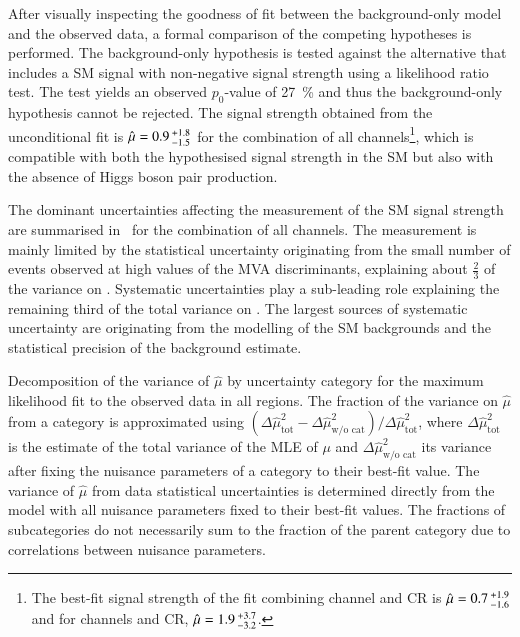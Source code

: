 
After visually inspecting the goodness of fit between the
background-only model and the observed data, a formal comparison of
the competing hypotheses is performed. The background-only hypothesis
is tested against the alternative that includes a SM \HH signal with
non-negative signal strength using a likelihood ratio test. The test
yields an observed $p_0$-value of \SI{27}{\percent} and thus the
background-only hypothesis cannot be rejected.
The signal strength obtained from the unconditional fit is
$\hat{\mu} = 0.9\,\numpmerr{+1.8}{-1.5}$ for the combination of all
channels\footnote{The best-fit signal strength of the fit combining
  \hadhad channel and CR is $\hat{\mu} = 0.7\,\numpmerr{+1.9}{-1.6}$
  and for \lephad channels and CR,
  $\hat{\mu} = 1.9\,\numpmerr{+3.7}{-3.2}$.}, which is compatible with
both the hypothesised signal strength in the SM but also with the
absence of Higgs boson pair production.

The dominant uncertainties affecting the measurement of the SM \HH
signal strength are summarised in~ for the
combination of all channels. The measurement is mainly limited by the
statistical uncertainty originating from the small number of events
observed at high values of the MVA discriminants, explaining about
$\frac{2}{3}$ of the variance on \muhat. Systematic uncertainties play
a sub-leading role explaining the remaining third of the total
variance on \muhat. The largest sources of systematic uncertainty are
originating from the modelling of the SM backgrounds and the
statistical precision of the background estimate.

\begin{table}[htbp]
  \centering

  \caption{Decomposition of the variance of $\hat{\mu}$ by uncertainty
    category for the maximum likelihood fit to the observed data in
    all regions. The fraction of the variance on $\hat{\mu}$ from a
    category is approximated using
    $(\Delta\hat{\mu}^2_{\text{tot}} - \Delta\hat{\mu}^2_{\text{w/o
        cat}}) / \Delta \hat{\mu}^2_{\text{tot}}$, where
    $\Delta\hat{\mu}^2_{\text{tot}}$ is the estimate of the total
    variance of the MLE of $\mu$ and
    $\Delta\hat{\mu}^2_{\text{w/o cat}}$ its variance after fixing the
    nuisance parameters of a category to their best-fit value. The
    variance of $\hat{\mu}$ from data statistical uncertainties is
    determined directly from the model with all nuisance parameters
    fixed to their best-fit values. The fractions of subcategories do
    not necessarily sum to the fraction of the parent category due to
    correlations between nuisance parameters.}

  

  \label{tab:breakdown_nonres}
\end{table}

